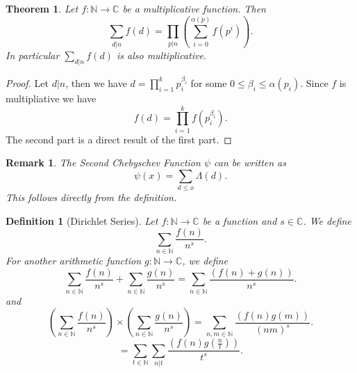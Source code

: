 \documentclass{article}
\newtheorem{theorem}{Theorem} [section]
\newtheorem{definition}{Definition}[section]
\newtheorem{remark}{Remark}[section]
\newcommand{\N}[0]{\mathbb{N}}
\newcommand{\C}[0]{\mathbb{C}}
\begin{document}
\begin{theorem}
  Let $f:\N\to\C$ be a multiplicative function. Then 
  \begin{equation*}
    \sum_{d|n}f(d) = \prod_{p|n}\left(\sum_{i=0}^{\alpha(p)} f(p^i)\right).
  \end{equation*}
  In particular $\sum_{d|n}f(d)$ is also multiplicative.
\end{theorem}

\begin{proof}
  Let $d|n$, then we have $d = \prod_{i=1}^k p_i^{\beta_i}$ for some $0\leq \beta_i\leq \alpha(p_i)$. 
  Since $f$ is multipliative we have 
  \begin{equation*}
    f(d) = \prod_{i=1}^kf(p_i^{\beta_i}).
  \end{equation*}
  The second part is a direct result of the first part.
\end{proof}

\begin{remark}
  The Second Chebyschev Function $\psi$ can be written as 
  \begin{equation*}
    \psi(x) = \sum_{d\leq x}\Lambda(d).
  \end{equation*}
  This follows directly from the definition.
  \label{remark_second_chebyschev_mangoldot}
\end{remark}

\begin{definition}[Dirichlet Series]
  Let $f:\N\to\C$ be a function and $s\in\C$. We define 
  \begin{equation*}
    \sum_{n\in\N}{\frac {f(n)} {n^s}}.
  \end{equation*}
  For another arithmetic function $g:\N\to \C$, we define 
  \begin{equation*}
    \sum_{n\in\N}{\frac {f(n)} {n^s}}+\sum_{n\in\N}{\frac {g(n)} {n^s}} = \sum_{n\in\N}{\frac {(f(n)+g(n))} {n^s}}.
  \end{equation*}
  and 
  \begin{equation*}
    \left(\sum_{n\in\N}{\frac {f(n)} {n^s}}\right)\times\left(\sum_{n\in\N}{\frac {g(n)} {n^s}}\right) = \sum_{n,m\in\N}{\frac {(f(n)g(m))} {(nm)^s}}.
  \end{equation*}
  \begin{equation*}
    = \sum_{t\in\N}\sum_{n|t}{\frac {\left(f(n)g\left({\frac n t}\right)\right)} {t^s}}.
  \end{equation*}
\end{definition}
\end{document}
